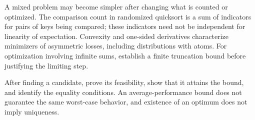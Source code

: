 A mixed problem may become simpler after changing what is counted or optimized. The comparison count in randomized quicksort is a sum of indicators for pairs of keys being compared; these indicators need not be independent for linearity of expectation. Convexity and one-sided derivatives characterize minimizers of asymmetric losses, including distributions with atoms. For optimization involving infinite sums, establish a finite truncation bound before justifying the limiting step.

After finding a candidate, prove its feasibility, show that it attains the bound, and identify the equality conditions. An average-performance bound does not guarantee the same worst-case behavior, and existence of an optimum does not imply uniqueness.
\par\smallskip
